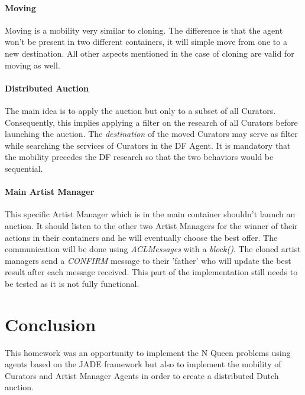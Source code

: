 \documentclass[a4paper,11pt]{article}
\begin{document}
  \paragraph{Moving}

  Moving is a mobility very similar to cloning. The difference is that the agent won't be present in
  two different containers, it will simple move from one to a new destination. All other aspects mentioned
  in the case of cloning are valid for moving as well.

  \paragraph{Distributed Auction}

  The main idea is to apply the auction but only to a subset of all Curators. Consequently, this implies
  applying a filter on the research of all Curators before launching the auction. The \textit{destination}
  of the moved Curators may serve as filter while searching the services of Curators in the DF Agent. It is
  mandatory that the mobility precedes the DF research so that the two behaviors would be sequential.

  \paragraph{Main Artist Manager}
  This specific Artist Manager which is in the main container shouldn't launch an auction. It should listen
  to the other two Artist Managers for the winner of their actions in their containers and he will eventually
  choose the best offer. The communication will be done using \textit{ACLMessages} with a \textit{block()}. The
  cloned artist managers send a \textit{CONFIRM} message to their 'father' who will update the best result
  after each message received. This part of the implementation still needs to be tested as it is not fully functional.

  \section{Conclusion}
  
  This homework was an opportunity to implement the N Queen problems using agents based on the JADE framework
  but also to implement the mobility of Curators and Artist Manager Agents in order to create a distributed
  Dutch auction.
\end{document}
